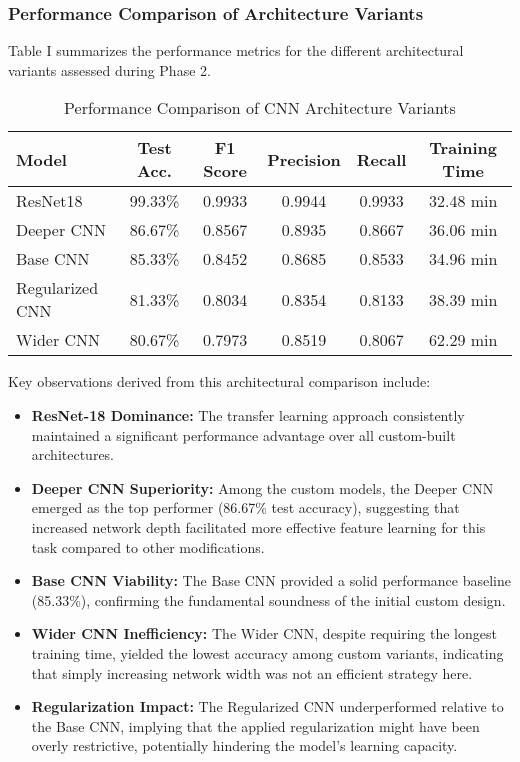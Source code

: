 \subsubsection{Performance Comparison of Architecture Variants}
Table I summarizes the performance metrics for the different architectural variants assessed during Phase 2.

\begin{table}[ht]
\caption{Performance Comparison of CNN Architecture Variants}
\centering
\begin{tabular}{lccccc}
\toprule
\textbf{Model} & \textbf{Test Acc.} & \textbf{F1 Score} & \textbf{Precision} & \textbf{Recall} & \textbf{Training Time} \\
\midrule
ResNet18 & 99.33\% & 0.9933 & 0.9944 & 0.9933 & 32.48 min \\
Deeper CNN & 86.67\% & 0.8567 & 0.8935 & 0.8667 & 36.06 min \\
Base CNN & 85.33\% & 0.8452 & 0.8685 & 0.8533 & 34.96 min \\
Regularized CNN & 81.33\% & 0.8034 & 0.8354 & 0.8133 & 38.39 min \\
Wider CNN & 80.67\% & 0.7973 & 0.8519 & 0.8067 & 62.29 min \\
\bottomrule
\end{tabular}
\end{table}

Key observations derived from this architectural comparison include:
\begin{itemize}
    \item \textbf{ResNet-18 Dominance:} The transfer learning approach consistently maintained a significant performance advantage over all custom-built architectures.
    \item \textbf{Deeper CNN Superiority:} Among the custom models, the Deeper CNN emerged as the top performer (86.67\% test accuracy), suggesting that increased network depth facilitated more effective feature learning for this task compared to other modifications.
    \item \textbf{Base CNN Viability:} The Base CNN provided a solid performance baseline (85.33\%), confirming the fundamental soundness of the initial custom design.
    \item \textbf{Wider CNN Inefficiency:} The Wider CNN, despite requiring the longest training time, yielded the lowest accuracy among custom variants, indicating that simply increasing network width was not an efficient strategy here.
    \item \textbf{Regularization Impact:} The Regularized CNN underperformed relative to the Base CNN, implying that the applied regularization might have been overly restrictive, potentially hindering the model's learning capacity.
\end{itemize}

